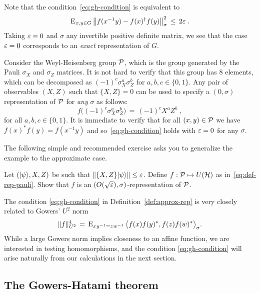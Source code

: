 Note that the condition~\eqref{eq:gh-condition} is equivalent to 
\begin{equation}
\label{eq:gh-condition-2}
\textsc{E}_{x,y\in G} \, \big\| f(x^{-1}y) - f(x)^\dagger f(y) \big\|_\sigma^2 \,\leq\, 2\varepsilon\;.
\end{equation}
Taking $\varepsilon=0$ and $\sigma$ any invertible positive definite matrix, we see that the case $\varepsilon=0$ corresponds to an \emph{exact} representation of $G$. 

\begin{example}
\label{ex:wh-1}
Consider the Weyl-Heisenberg group $\mathcal{P}$, which is the group generated by the Pauli $\sigma_X$ and $\sigma_Z$ matrices. It is not hard to verify that this group has $8$ elements, which can be decomposed as $(-1)^c \sigma_X^a \sigma_Z^b$ for $a,b,c\in\{0,1\}$. Any pair of observables $(X,Z)$ such that $\{X,Z\}=0$ can be used to specify a $(0,\sigma)$ representation of $\mathcal{P}$ for \emph{any} $\sigma$ as follows:
\begin{equation}
\label{eq:def-rep-pauli}
 f\big((-1)^c \sigma_X^a \sigma_Z^b\big) \,=\, (-1)^c X^a Z^b\;,
\end{equation}
for all $a,b,c\in\{0,1\}$. It is immediate to verify that for all $(x,y)\in \mathcal{P}$ we have $f(x)^*f(y)=f(x^{-1}y)$ and so~\eqref{eq:gh-condition} holds with $\varepsilon=0$ for any $\sigma$.
\end{example}

The following simple and recommended exercise asks you to generalize the example to the approximate case. 

\begin{exercise}
\label{ex:wh-2}
Let $(|\psi\rangle,X,Z)$ be such that $\|\{X,Z\}|\psi\rangle\|\leq \varepsilon$. Define $f:\mathcal{P} \mapsto U(\mathcal{H})$ as in~\eqref{eq:def-rep-pauli}. Show that $f$ is an $(O(\sqrt{\varepsilon}),\sigma)$-representation of $\mathcal{P}$. 
\end{exercise}

\begin{remark}
The condition \eqref{eq:gh-condition} in Definition~\ref{def:approx-rep} is very closely related to Gowers' $U^2$ norm
$$\|f\|_{U^2}^4 \,=\, \textsc{E}_{xy^{-1}=zw^{-1}}\, \big\langle f(x)f(y)^* ,f(z)f(w)^* \big\rangle_\sigma.$$
While a large Gowers norm implies closeness to an affine function, we are interested in testing homomorphisms, and the condition \eqref{eq:gh-condition} will arise naturally from our calculations in the next section. 
\end{remark}

\subsection{The Gowers-Hatami theorem}

